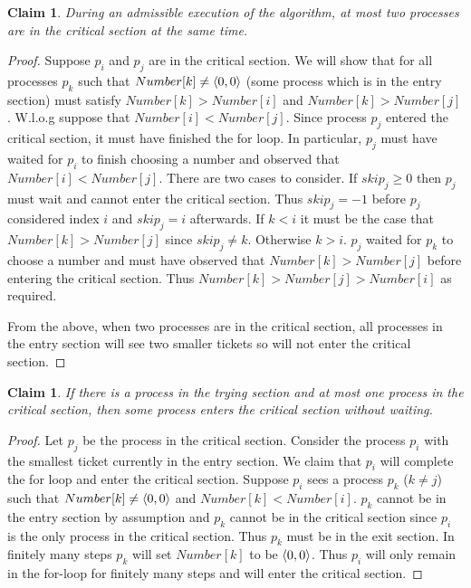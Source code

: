 \documentclass[11pt]{article}
\newtheorem{claim}[theorem]{Claim}
\DeclarePairedDelimiter\anglebrac{\langle}{\rangle}
\begin{document}
\begin{claim}
During an admissible execution of the algorithm, at most two processes are in the critical section at the same time.
\end{claim}
\begin{proof}
Suppose $p_i$ and $p_j$ are in the critical section. We will show that for all processes $p_k$ such that $Number[k] \neq \anglebrac{0,0}$ (some process which is in the entry section) must satisfy $Number[k] > Number[i]$ and $Number[k] > Number[j]$. W.l.o.g suppose that $Number[i] < Number[j]$. Since process $p_j$ entered the critical section, it must have finished the for loop. In particular, $p_j$ must have waited for $p_i$ to finish choosing a number and observed that $Number[i] < Number[j]$. There are two cases to consider. If $skip_j \geq 0$ then $p_j$ must wait and cannot enter the critical section. Thus $skip_j = -1$ before $p_j$ considered index $i$ and $skip_j = i$ afterwards. If $k < i$ it must be the case that $Number[k] > Number[j]$ since $skip_j \neq k$. Otherwise $k > i$. $p_j$ waited for $p_k$ to choose a number and must have observed that $Number[k] > Number[j]$ before entering the critical section. Thus $Number[k] > Number[j] > Number[i]$ as required. 

From the above, when two processes are in the critical section, all processes in the entry section will see two smaller tickets so will not enter the critical section.   
\end{proof}


\begin{claim}
If there is a process in the trying section and at most one process in the critical section, then some process enters the critical section without waiting.
\end{claim}
\begin{proof}
Let $p_j$ be the process in the critical section. Consider the process $p_i$ with the smallest ticket currently in the entry section. We claim that $p_i$ will complete the for loop and enter the critical section. Suppose $p_i$ sees a process $p_k$ ($k \neq j$) such that $Number[k] \neq \anglebrac{0,0}$ and $Number[k] < Number[i]$. $p_k$ cannot be in the entry section by assumption and $p_k$ cannot be in the critical section since $p_i$ is the only process in the critical section. Thus $p_k$ must be in the exit section. In finitely many steps $p_k$ will set $Number[k]$ to be $\anglebrac{0,0}$. Thus $p_i$ will only remain in the for-loop for finitely many steps and will enter the critical section.
\end{proof} 

\end{document}
